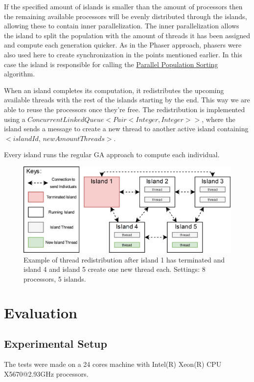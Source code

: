 \documentclass[runningheads]{llncs}
\begin{document}
 If the specified amount of islands is smaller than the amount of processors then the remaining available processors will be evenly distributed through the islands, allowing these to contain inner parallelization. The inner parallelization allows the island to split the population with the amount of threads it has been assigned and compute each generation quicker. As in the Phaser approach, phasers were also used here to create synchronization in the points mentioned earlier. In this case the island is responsible for calling the \hyperref[subsubsec:parallelSort]{Parallel Population Sorting} algorithm.

When an island completes its computation, it redistributes the upcoming available threads with the rest of the islands starting by the end. This way we are able to reuse the processors once they're free. The redistribution is implemented using a \(ConcurrentLinkedQueue<Pair<Integer, Integer>>\), where the island sends a message to create a new thread to another active island containing \(<islandId, \,newAmountThreads>\).

Every island runs the regular GA approach to compute each individual.

\begin{figure}[htbp]
\centering
\includegraphics[width=.92\textwidth]{IslandModel.png}
\caption{Example of thread redistribution after island 1 has terminated and island 4 and island 5 create one new thread each. Settings: 8 processors, 5 islands.} \label{islandDiagram}
\end{figure}


\section{Evaluation}

\subsection{Experimental Setup}
The tests were made on a 24 cores machine with Intel(R) Xeon(R) CPU X5670@2.93GHz processors.
\end{document}
